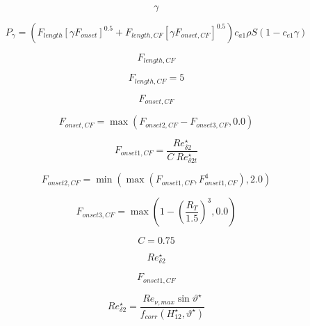 

\begin{equation}
\gamma
\end{equation}

\begin{equation}
P_{\gamma} = \left(F_{length} [\gamma F_{onset}]^{0.5} + F_{length,CF} [\gamma F_{onset,CF}]^{0.5}\right) 
   c_{a1} \rho S \left(1 - c_{e1} \gamma\right)
\end{equation}

\begin{equation}
F_{length,CF}
\end{equation}

\begin{equation}
F_{length,CF} = 5
\end{equation}

\begin{equation}
F_{onset,CF}
\end{equation}

\begin{equation}
F_{onset,CF} = \max\left(F_{onset2,CF} - F_{onset3,CF}, 0.0\right)
\end{equation}

\begin{equation}
F_{onset1,CF} = \frac{Re_{\delta 2}^{\star}}{C\ Re_{\delta 2t}^{\star}}
\end{equation}

\begin{equation}
F_{onset2,CF} = \min\left(\max\left(F_{onset1,CF}, F_{onset1,CF}^4\right), 2.0\right)
\end{equation}

\begin{equation}
F_{onset3,CF} = \max\left(1 - \left(\frac{R_T}{1.5}\right)^3, 0.0\right)
\end{equation}

\begin{equation}
C = 0.75
\end{equation}

\begin{equation}
Re_{\delta 2}^{\star}
\end{equation}

\begin{equation}
F_{onset1,CF}
\end{equation}

\begin{equation}
Re_{\delta 2}^{\star} = \frac{Re_{\nu,max} \sin
\vartheta^{\star}} {f_{corr} (H_{12}^{\star}, \vartheta^{\star})}
\end{equation}

